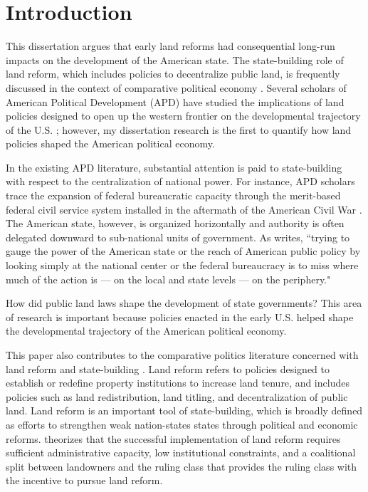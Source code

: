 \chapter{Introduction}

This dissertation argues that early land reforms had consequential long-run impacts on the development of the American state. The state-building role of land reform, which includes policies to decentralize public land, is frequently discussed in the context of comparative political economy \citep[e.g.,][]{albertus2015autocracy,murtazashvili2016does}. Several scholars of American Political Development (APD) have studied the implications of land policies designed to open up the western frontier on the developmental trajectory of the U.S. \citep[e.g.,][]{bensel1990,frymer2014rush}; however, my dissertation research is the first to quantify how land policies shaped the American political economy. 

In the existing APD literature, substantial attention is paid to state-building with respect to the centralization of national power.  For instance, APD scholars trace the expansion of federal bureaucratic capacity through the merit-based federal civil service system installed in the aftermath of the American Civil War \citep{skowronek1982building,bensel1990,carpenter2001}. The American state, however, is organized horizontally and authority is often delegated downward to sub-national units of government. As \citet{novak2008myth} writes, ``trying to gauge the power of the American state or the reach of American public policy by looking simply at the national center or the federal bureaucracy is to miss where much of the action is --- on the local and state levels --- on the periphery." 

How did public land laws shape the development of state governments? This area of research is important because policies enacted in the early U.S. helped shape the developmental trajectory of the American political economy. %

This paper also contributes to the comparative politics literature concerned with land reform and state-building  \citep[e.g.,][]{albertus2015autocracy, murtazashvili2016does}. Land reform refers to policies designed to establish or redefine property institutions to increase land tenure, and includes policies such as land redistribution, land titling, and decentralization of public land. Land reform is an important tool of state-building, which is broadly defined as efforts to strengthen weak nation-states states through political and economic reforms. \citet{albertus2015autocracy} theorizes that the successful implementation of land reform requires sufficient administrative capacity, low institutional constraints, and a coalitional split between landowners and the ruling class that provides the ruling class with the incentive to pursue land reform.

